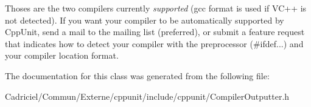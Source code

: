 Thoses are the two compilers currently {\itshape supported} (gcc format is used if V\-C++ is not detected). If you want your compiler to be automatically supported by Cpp\-Unit, send a mail to the mailing list (preferred), or submit a feature request that indicates how to detect your compiler with the preprocessor (\#ifdef...) and your compiler location format. 

The documentation for this class was generated from the following file\-:\begin{DoxyCompactItemize}
\item 
Cadriciel/\-Commun/\-Externe/cppunit/include/cppunit/Compiler\-Outputter.\-h\end{DoxyCompactItemize}
